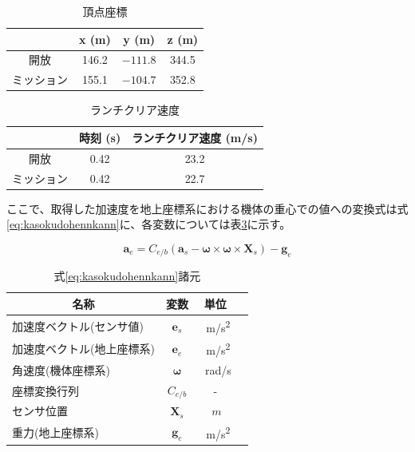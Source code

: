 \documentclass[a4paper,11pt,uplatex]{jsarticle}
\begin{document}
\begin{table}[H]
	\centering
	\caption{頂点座標}
	\label{tab:tyouten_kiban}
	\begin{tabular}{cccc}
		\hline
		      & x (\si{m}) & y (\si{m}) & z (\si{m}) \\\hline
		開放    & 146.2      & $-111.8$   & 344.5      \\
		ミッション & 155.1      & $-104.7$   & 352.8      \\
		\hline
	\end{tabular}
\end{table}

\begin{table}[H]
	\centering
	\caption{ランチクリア速度}
	\label{tab:launch_sokudo}
	\begin{tabular}{ccc}
		\hline
		      & 時刻 (\si{s}) & ランチクリア速度 (\si{m/s}) \\
		\hline
		開放    & 0.42        & 23.2                \\
		ミッション & 0.42        & 22.7                \\
		\hline
	\end{tabular}
\end{table}

ここで、取得した加速度を地上座標系における機体の重心での値への変換式は式\eqref{eq:kasokudohennkann}に、各変数については表\ref{tab:henkan_keisu}に示す。

\begin{equation}
	\bm{a}_e = C_{e/b}\left(\bm{a}_s-\bm{\omega}\times \bm{\omega}\times \bm{X}_s\right)-\bm{g}_e
	\label{eq:kasokudohennkann}
\end{equation}

\begin{table}[H]
	\centering
	\caption{式\eqref{eq:kasokudohennkann}諸元}
	\label{tab:henkan_keisu}
	\begin{tabular}{lccr}
		\toprule
		\multicolumn{1}{c}{名称} & 変数            & 単位           \\
		\midrule
		加速度ベクトル(センサ値)          & $\bm{e}_s$    & \SI{}{m/s^2} \\
		加速度ベクトル(地上座標系)         & $\bm{e}_e$    & \SI{}{m/s^2} \\
		角速度(機体座標系)             & $\bm{\omega}$ & \SI{}{rad/s} \\
		座標変換行列                 & $C_{e/b}$     & -            \\
		センサ位置                  & $\bm{X}_s$    & $\SI{}{m}$   \\
		重力(地上座標系)              & $\bm{g}_e$    & \SI{}{m/s^2} \\
		\bottomrule
	\end{tabular}
\end{table}
\end{document}
